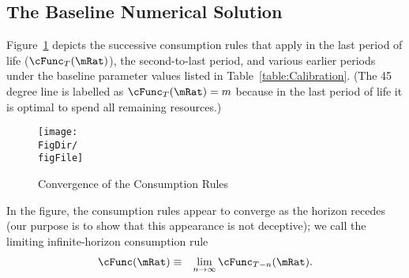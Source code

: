 \documentclass[titlepage]{\econtex}\providecommand{\texname}{BufferStockTheory}
\providecommand{\FigDir}{Figures}
\providecommand{\TableDir}{Tables}
\begin{document}
\begin{comment}
In the case where the permanent shocks are lognormally distributed, we have
\begin{eqnarray}
\Ex[\pshk^{1-\CRRA}] & = &\exp((1-\CRRA)(-\sigma^{2}_{\pshk}/2)+(1-\CRRA)^{2}\sigma_{\pshk}^{2})
\\ & = & \exp((1-\CRRA)((-1/2)+(1-\CRRA))\sigma_{\pshk}^{2})
\\ & = & \exp((1-\CRRA)(1/2-\CRRA)\sigma_{\pshk}^{2})
\end{eqnarray}
\end{comment}

\begin{comment}
Equation
  \eqref{eq:GIC} can be raised to the $\CRRA$ power yielding the
  alternative form $(\Rfree \DiscFac) \PGroAdj^{-\CRRA} < 1$ which
  Deaton~\citeyearpar{deatonLiqConstr} imposed to guarantee that his
  problem defined a contraction mapping.
\end{comment}


\hypertarget{Baseline-Numerical-Solution}{}
\subsection{The Baseline Numerical Solution}

Figure~\ref{fig:cFuncsConverge} depicts the successive consumption
rules that apply in the last period of life ($\cFunc_{T}(\mRat)$), the
second-to-last period, and various earlier periods under the
baseline parameter values listed in Table~\ref{table:Calibration}.
(The 45 degree line is labelled as $\cFunc_{T}(\mRat) = m$ because in
the last period of life it is optimal to spend all remaining
resources.)



\providecommand{\figName}{Convergence-of-the-Consumption-Rules}
\providecommand{\figFile}{cFuncsConverge}
\hypertarget{\figFile}{}
\hypertarget{\figName}{}
\begin{figure}[tbp]
\centerline{\texttt{[image: \\FigDir/\\figFile]}}
\caption{Convergence of the Consumption Rules}
\label{fig:\figFile}
\end{figure}

In the figure, the consumption rules appear to converge as the horizon
recedes (our purpose is to show that this appearance is not deceptive); we
call the limiting infinite-horizon consumption rule
\begin{eqnarray}
\cFunc(\mRat) & \equiv & \lim_{n \rightarrow \infty} \cFunc_{T-n}(\mRat).
\end{eqnarray}
\end{document}
